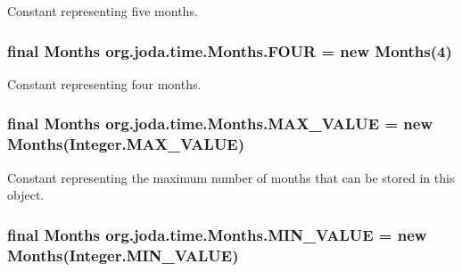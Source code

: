 Constant representing five months. \hypertarget{classorg_1_1joda_1_1time_1_1_months_a7b649c42eea6f68174c9f3ab2f0ac63e}{
\subsubsection[{F\-O\-U\-R}]{\setlength{\rightskip}{0pt plus 5cm}final {\bf Months} org.\-joda.\-time.\-Months.\-F\-O\-U\-R = new {\bf Months}(4)\hspace{0.3cm}{\ttfamily [static]}}}\label{classorg_1_1joda_1_1time_1_1_months_a7b649c42eea6f68174c9f3ab2f0ac63e}
Constant representing four months. \hypertarget{classorg_1_1joda_1_1time_1_1_months_a7c07b69672d6d8a94472b777724c3a0b}{
\subsubsection[{M\-A\-X\-\_\-\-V\-A\-L\-U\-E}]{\setlength{\rightskip}{0pt plus 5cm}final {\bf Months} org.\-joda.\-time.\-Months.\-M\-A\-X\-\_\-\-V\-A\-L\-U\-E = new {\bf Months}(Integer.\-M\-A\-X\-\_\-\-V\-A\-L\-U\-E)\hspace{0.3cm}{\ttfamily [static]}}}\label{classorg_1_1joda_1_1time_1_1_months_a7c07b69672d6d8a94472b777724c3a0b}
Constant representing the maximum number of months that can be stored in this object. \hypertarget{classorg_1_1joda_1_1time_1_1_months_a1181aaad3ed5d6f89d9e3cb289dbde25}{
\subsubsection[{M\-I\-N\-\_\-\-V\-A\-L\-U\-E}]{\setlength{\rightskip}{0pt plus 5cm}final {\bf Months} org.\-joda.\-time.\-Months.\-M\-I\-N\-\_\-\-V\-A\-L\-U\-E = new {\bf Months}(Integer.\-M\-I\-N\-\_\-\-V\-A\-L\-U\-E)\hspace{0.3cm}{\ttfamily [static]}}}\label{classorg_1_1joda_1_1time_1_1_months_a1181aaad3ed5d6f89d9e3cb289dbde25}

